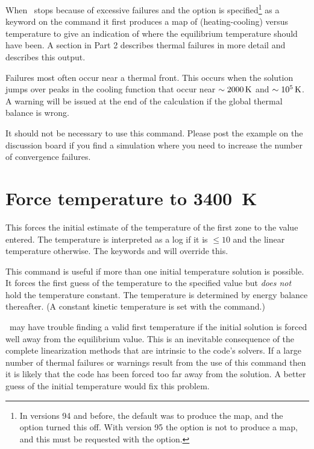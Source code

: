 When \Cloudy\ stops because of excessive failures and the
 option is
specified\footnote{In versions 94 and before,
the default was to produce the map, and
the  option turned this off.
With version 95 the option is not to
produce a map, and this must be requested with the
 option.}
as a keyword on the  command it first
produces a map
of (heating-cooling) versus temperature to give an indication
of where the
equilibrium temperature should have been.
A section in Part 2 describes
thermal failures in more detail and describes this output.

Failures most often occur near a thermal front.
This occurs when the
solution jumps over peaks in the cooling function that occur near
$\sim2000 {\rm\thinspace K}$ and $\sim 10^5 {\rm\thinspace K}$.
A warning will be issued at the end of the calculation if
the global thermal balance is wrong.

It should not be necessary to use this command.
Please post the example
on the discussion board if you find a simulation where you need to
increase the number of convergence failures.

\section{Force temperature to 3400~K}

This forces the initial estimate of the temperature of the first zone
to the value entered.  The temperature is interpreted as a log if it is
$\le 10$ and the linear temperature otherwise.
The keywords  and  will override this.

This command is useful if more than one initial temperature solution
is possible.
It forces the first guess of the temperature to the specified
value but \emph{does not} hold the temperature constant.
The temperature is
determined by energy balance thereafter.
(A constant kinetic temperature
is set with the  command.)

\Cloudy\ may have trouble finding a valid first temperature if the initial
solution is forced well away from the equilibrium value.
This is an
inevitable consequence of the complete linearization methods that are
intrinsic to the code's solvers.
If a large number of thermal failures
or warnings result from the use of this command then it is likely that the
code has been forced too far away from the solution.
A better guess of
the initial temperature would fix this problem.

